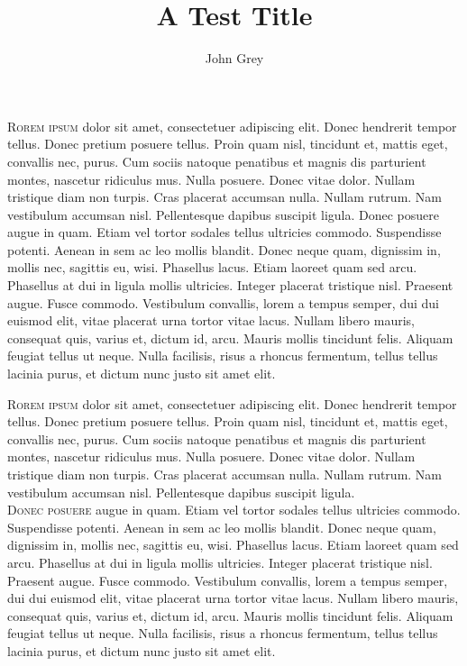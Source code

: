 \documentclass[12pt]{article}
\title{A Test Title}
\author{John Grey}
\begin{document}
\maketitle

\lettrine[loversize=0.1, lines=4,depth=1,findent=4pt,nindent=4pt]{R}{orem ipsum} dolor sit amet,
consectetuer adipiscing elit.  Donec hendrerit tempor tellus.  Donec pretium
posuere tellus.  Proin quam nisl, tincidunt et, mattis eget, convallis nec,
purus.  Cum sociis natoque penatibus et magnis dis parturient montes, nascetur
ridiculus mus.  Nulla posuere.  Donec vitae dolor.  Nullam tristique diam non
turpis.  Cras placerat accumsan nulla.  Nullam rutrum.  Nam vestibulum accumsan
nisl. Pellentesque dapibus suscipit ligula.  Donec posuere augue in quam.  Etiam
vel tortor sodales tellus ultricies commodo.  Suspendisse potenti.  Aenean in
sem ac leo mollis blandit.  Donec neque quam, dignissim in, mollis nec, sagittis
eu, wisi.  Phasellus lacus.  Etiam laoreet quam sed arcu.  Phasellus at dui in
ligula mollis ultricies.  Integer placerat tristique nisl.  Praesent augue.
Fusce commodo.  Vestibulum convallis, lorem a tempus semper, dui dui euismod
elit, vitae placerat urna tortor vitae lacus.  Nullam libero mauris, consequat
quis, varius et, dictum id, arcu.  Mauris mollis tincidunt felis.  Aliquam
feugiat tellus ut neque.  Nulla facilisis, risus a rhoncus fermentum, tellus
tellus lacinia purus, et dictum nunc justo sit amet elit.

\medskip

\setmainfont{FiraCode-Medium.otf}
\lettrine[depth=0,lraise=0.7, findent=0pt,nindent=2pt]{R}{orem ipsum} dolor sit amet,
consectetuer adipiscing elit.  Donec hendrerit tempor tellus.  Donec pretium
posuere tellus.  Proin quam nisl, tincidunt et, mattis eget, convallis nec,
purus.  Cum sociis natoque penatibus et magnis dis parturient montes, nascetur
ridiculus mus.  Nulla posuere.  Donec vitae dolor.  Nullam tristique diam non
turpis.  Cras placerat accumsan nulla.  Nullam rutrum.  Nam vestibulum accumsan
nisl. Pellentesque dapibus suscipit ligula.\\

\pagebreak
\lettrine{D}{onec posuere} augue in quam.  Etiam
vel tortor sodales tellus ultricies commodo.  Suspendisse potenti.  Aenean in
sem ac leo mollis blandit.  Donec neque quam, dignissim in, mollis nec, sagittis
eu, wisi.  Phasellus lacus.  Etiam laoreet quam sed arcu.  Phasellus at dui in
ligula mollis ultricies.  Integer placerat tristique nisl.  Praesent augue.
Fusce commodo.  Vestibulum convallis, lorem a tempus semper, dui dui euismod
elit, vitae placerat urna tortor vitae lacus.  Nullam libero mauris, consequat
quis, varius et, dictum id, arcu.  Mauris mollis tincidunt felis.  Aliquam
feugiat tellus ut neque.  Nulla facilisis, risus a rhoncus fermentum, tellus
tellus lacinia purus, et dictum nunc justo sit amet elit.






\nocite{*}

% 
\end{document}
